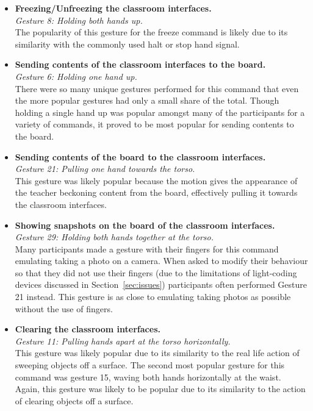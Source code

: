 \documentclass[link]{IWCOMP}
\begin{document}
\begin{itemize}
\item \textbf{Freezing/Unfreezing the classroom interfaces.}\\
\textit{Gesture 8: Holding both hands up.}\\  
The popularity of this gesture for the freeze command is likely due to its similarity with the commonly used halt or stop hand signal.\\

\item \textbf{Sending contents of the classroom interfaces to the board.}\\
\textit{Gesture 6: Holding one hand up.}\\
There were so many unique gestures performed for this command that even the more popular gestures had only a small share of the total.
Though holding a single hand up was popular amongst many of the participants for a variety of commands, it proved to be most popular for sending contents to the board.\\

\item \textbf{Sending contents of the board to the classroom interfaces.}\\
\textit{Gesture 21: Pulling one hand towards the torso.}\\
This gesture was likely popular because the motion gives the appearance of the teacher beckoning content from the board, effectively pulling it towards the classroom interfaces.\\

\item \textbf{Showing snapshots on the board of the classroom interfaces.}\\
\textit{Gesture 29: Holding both hands together at the torso.}\\
Many participants made a gesture with their fingers for this command emulating taking a photo on a camera.
When asked to modify their behaviour so that they did not use their fingers (due to the limitations of light-coding devices discussed in Section~\ref{sec:issues}) participants often performed Gesture 21 instead.
This gesture is as close to emulating taking photos as possible without the use of fingers.\\

\item \textbf{Clearing the classroom interfaces.}\\
\textit{Gesture 11: Pulling hands apart at the torso horizontally.}\\
This gesture was likely popular due to its similarity to the real life action of sweeping objects off a surface.
The second most popular gesture for this command was gesture 15, waving both hands horizontally at the waist.
Again, this gesture was likely to be popular due to its similarity to the action of clearing objects off a surface.\\

\end{itemize}
\end{document}
